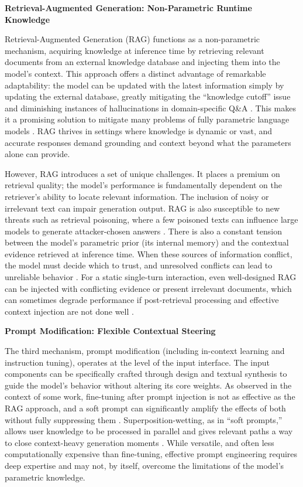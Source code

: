 \documentclass[11pt]{article}
\begin{document}
\textbf{Retrieval-Augmented Generation: Non-Parametric Runtime Knowledge}

Retrieval-Augmented Generation (RAG) functions as a non-parametric mechanism, acquiring knowledge at inference time by retrieving relevant documents from an external knowledge database and injecting them into the model's context. This approach offers a distinct advantage of remarkable adaptability: the model can be updated with the latest information simply by updating the external database, greatly mitigating the ``knowledge cutoff'' issue and diminishing instances of hallucinations in domain-specific Q\&A \cite{ref66}. This makes it a promising solution to mitigate many problems of fully parametric language models \cite{ref28}. RAG thrives in settings where knowledge is dynamic or vast, and accurate responses demand grounding and context beyond what the parameters alone can provide.

However, RAG introduces a set of unique challenges. It places a premium on retrieval quality; the model's performance is fundamentally dependent on the retriever's ability to locate relevant information. The inclusion of noisy or irrelevant text can impair generation output. RAG is also susceptible to new threats such as retrieval poisoning, where a few poisoned texts can influence large models to generate attacker-chosen answers \cite{ref257}. There is also a constant tension between the model's parametric prior (its internal memory) and the contextual evidence retrieved at inference time. When these sources of information conflict, the model must decide which to trust, and unresolved conflicts can lead to unreliable behavior \cite{ref37}. For a static single-turn interaction, even well-designed RAG can be injected with conflicting evidence or present irrelevant documents, which can sometimes degrade performance if post-retrieval processing and effective context injection are not done well \cite{ref58}.

\textbf{Prompt Modification: Flexible Contextual Steering}

The third mechanism, prompt modification (including in-context learning and instruction tuning), operates at the level of the input interface. The input components can be specifically crafted through design and textual synthesis to guide the model's behavior without altering its core weights. As observed in the context of some work, fine-tuning after prompt injection is not as effective as the RAG approach, and a soft prompt can significantly amplify the effects of both without fully suppressing them \cite{ref423}. Superposition-wetting, as in ``soft prompts,'' allows user knowledge to be processed in parallel and gives relevant paths a way to close context-heavy generation moments \cite{ref424}. While versatile, and often less computationally expensive than fine-tuning, effective prompt engineering requires deep expertise and may not, by itself, overcome the limitations of the model's parametric knowledge.
\end{document}
